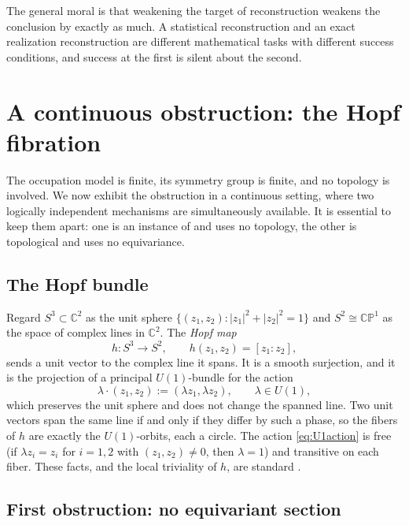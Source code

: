 \documentclass[11pt,reqno]{amsart}
\theoremstyle{plain}
\theoremstyle{definition}
\theoremstyle{remark}
\begin{document}
The general moral is that weakening the target of reconstruction weakens the conclusion by exactly as much. A statistical reconstruction and an exact realization reconstruction are different mathematical tasks with different success conditions, and success at the first is silent about the second.

\section{A continuous obstruction: the Hopf fibration}
\label{sec:hopf}

The occupation model is finite, its symmetry group is finite, and no topology is involved. We now exhibit the obstruction in a continuous setting, where two logically independent mechanisms are simultaneously available. It is essential to keep them apart: one is an instance of  and uses no topology, the other is topological and uses no equivariance.

\subsection{The Hopf bundle}

Regard $S^{3}\subset\mathbb{C}^{2}$ as the unit sphere $\{(z_{1},z_{2}):|z_{1}|^{2}+|z_{2}|^{2}=1\}$ and $S^{2}\cong\mathbb{CP}^{1}$ as the space of complex lines in $\mathbb{C}^{2}$. The \emph{Hopf map}
\begin{equation}
\label{eq:hopf}
h\colon S^{3}\longrightarrow S^{2},
\qquad
h(z_{1},z_{2})=[z_{1}:z_{2}],
\end{equation}
sends a unit vector to the complex line it spans. It is a smooth surjection, and it is the projection of a principal $U(1)$-bundle for the action
\begin{equation}
\label{eq:U1action}
\lambda\cdot(z_{1},z_{2}):=(\lambda z_{1},\lambda z_{2}),
\qquad \lambda\in U(1),
\end{equation}
which preserves the unit sphere and does not change the spanned line. Two unit vectors span the same line if and only if they differ by such a phase, so the fibers of $h$ are exactly the $U(1)$-orbits, each a circle. The action \eqref{eq:U1action} is free (if $\lambda z_{i}=z_{i}$ for $i=1,2$ with $(z_{1},z_{2})\neq 0$, then $\lambda=1$) and transitive on each fiber. These facts, and the local triviality of $h$, are standard \cite{Steenrod,Husemoller,Naber}.

\subsection{First obstruction: no equivariant section}
\end{document}
